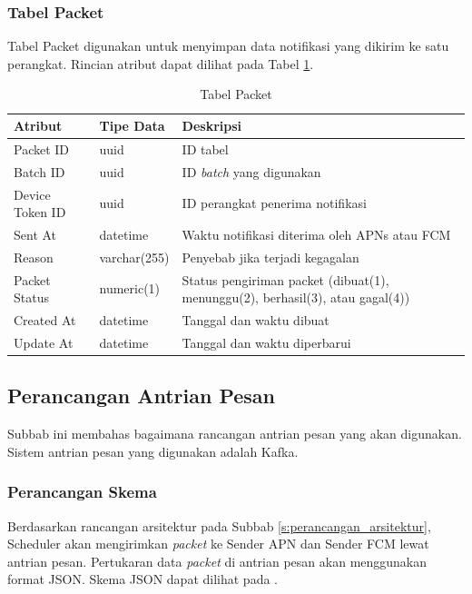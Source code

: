 \subsubsection{Tabel Packet} \label{s:tabel_packet}
\par Tabel Packet digunakan untuk menyimpan data notifikasi yang dikirim ke satu perangkat. Rincian atribut dapat dilihat pada Tabel \ref{tabel_packet}.
\begin{longtable}{|p{2cm}|p{2.5cm}|p{4.5cm}|}
	\caption{Tabel Packet} \label{tabel_packet} \\ \hline
	\rowcolor{lightgray} {Atribut} & {Tipe Data} & {Deskripsi} \\ \hline
	\endhead
	Packet ID & uuid & ID tabel \\ \hline
	Batch ID & uuid & ID \textit{batch} yang digunakan \\ \hline
	Device Token ID & uuid & ID perangkat penerima notifikasi \\ \hline
	Sent At & datetime & Waktu notifikasi diterima oleh APNs atau FCM \\ \hline
	Reason & varchar(255) & Penyebab jika terjadi kegagalan \\ \hline
	Packet Status & numeric(1) & Status pengiriman packet (dibuat(1), menunggu(2), berhasil(3), atau gagal(4)) \\ \hline
	Created At & datetime & Tanggal dan waktu dibuat \\ \hline
	Update At & datetime & Tanggal dan waktu diperbarui \\ \hline
\end{longtable}

\subsection{Perancangan Antrian Pesan}
\par Subbab ini membahas bagaimana rancangan antrian pesan yang akan digunakan. Sistem antrian pesan yang digunakan adalah Kafka.

\subsubsection{Perancangan Skema}
\par Berdasarkan rancangan arsitektur pada Subbab \ref{s:perancangan_arsitektur}, Scheduler akan mengirimkan \textit{packet} ke Sender APN dan Sender FCM lewat antrian pesan. Pertukaran data \textit{packet} di antrian pesan akan menggunakan format JSON. Skema JSON dapat dilihat pada .

